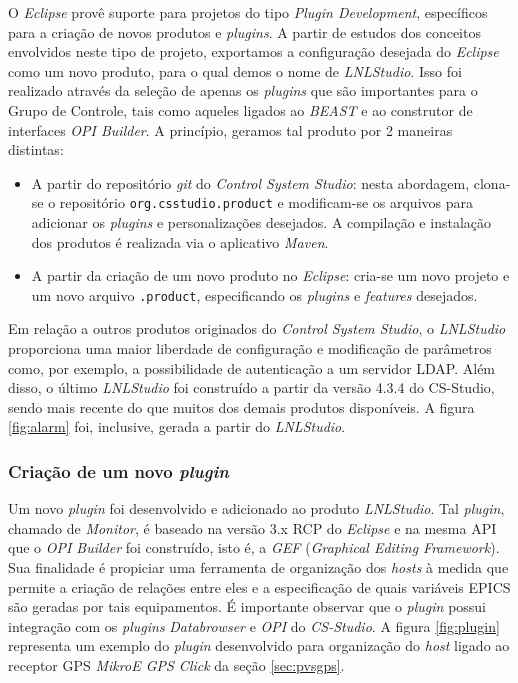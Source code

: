 O \textit{Eclipse} provê suporte para projetos do tipo \textit{Plugin
Development}, específicos para a criação de novos produtos e \textit{plugins}. A
partir de estudos dos conceitos envolvidos neste tipo de projeto, exportamos a
configuração desejada do \textit{Eclipse} como um novo produto, para o qual
demos o nome de \textit{LNLStudio}. Isso foi realizado através da seleção de
apenas os \textit{plugins} que são importantes para o Grupo de Controle, tais
como aqueles ligados ao \textit{BEAST} e ao construtor de interfaces \textit{OPI
Builder}. A princípio, geramos tal produto por 2 maneiras distintas:

\begin{itemize}\renewcommand\labelitemi{--}
  \item A partir do repositório \textit{git} do \textit{Control System Studio}:
 nesta abordagem, clona-se o repositório \texttt{org.csstudio.product} e
 modificam-se os arquivos para adicionar os \textit{plugins} e personalizações
 desejados. A compilação e instalação dos produtos é realizada via o aplicativo
 \textit{Maven}.

 \item A partir da criação de um novo produto no \textit{Eclipse}: cria-se um
 novo projeto e um novo arquivo \texttt{.product}, especificando os
 \textit{plugins} e \textit{features} desejados.
\end{itemize}

Em relação a outros produtos originados do \textit{Control System Studio}, o
\textit{LNLStudio} proporciona uma maior liberdade de configuração e modificação de parâmetros como, por
exemplo, a possibilidade de autenticação a um servidor LDAP. Além disso, o
último \textit{LNLStudio} foi construído a partir da versão 4.3.4 do CS-Studio,
sendo mais recente do que muitos dos demais produtos disponíveis. A figura
\ref{fig:alarm} foi, inclusive, gerada a partir do \textit{LNLStudio}.

\subsubsection{Criação de um novo \textit{plugin}}

Um novo \textit{plugin} foi desenvolvido e adicionado ao produto
\textit{LNLStudio}. Tal \textit{plugin}, chamado de \textit{Monitor}, é baseado
na versão 3.x RCP do \textit{Eclipse} e na mesma API que o \textit{OPI Builder}
foi construído, isto é, a \textit{GEF} (\textit{Graphical Editing Framework}).
Sua finalidade é propiciar uma ferramenta de organização dos \textit{hosts} à
medida que permite a criação de relações entre eles e a especificação de quais
variáveis EPICS são geradas por tais equipamentos. É importante observar que o
\textit{plugin} possui integração com os \textit{plugins} \textit{Databrowser} e
\textit{OPI} do \textit{CS-Studio}. A figura \ref{fig:plugin} representa um
exemplo do \textit{plugin} desenvolvido para organização do \textit{host} ligado
ao receptor GPS \textit{MikroE GPS Click} da seção \ref{sec:pvsgps}.

